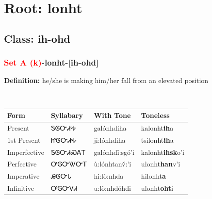\needspace{4in}
\section*{Root: lonht}
\nopagebreak
{}
\needspace{3in}
\subsection*{Class: ih-ohd}
\nopagebreak
\needspace{2in}
\subsubsection*{\textcolor{Red}{Set A (k)}{-}\textbf{lonht}{-}[ih-ohd]}
\nopagebreak
\textbf{Definition: } he/she is making him/her fall from an elevated position
\\[0.5em]
\begin{tabularx}{\textwidth}{l X X X}%
\toprule%
\textbf{Form}&\textbf{Syllabary}&\textbf{With Tone}&\textbf{Toneless}\\%
\midrule%
Present&ᎦᎶᏅᏗᎭ&galónhdiha&kalonht\textbf{ih}a\\%
1st Present&ᏥᎶᏅᏗᎭ&ji:lónhdiha&tsilonht\textbf{ih}a\\%
Imperfective&ᎦᎶᏅᏗᏍᎪᎢ&galónhdǐ:sgó’i&kalonht\textbf{ihsk}o'i\\%
Perfective&ᎤᎶᏅᏔᏅᎢ&ù:lónhtanv̌:’i&ulonht\textbf{han}v'i\\%
Imperative&ᎯᎶᏅᏓ&hi:lò:nhda&hilonht\textbf{a}\\%
Infinitive&ᎤᎶᏅᏙᏗ&u:lò:nhdóhdi&ulonht\textbf{oht}i\\%
\bottomrule%
\end{tabularx}
\\[1em]